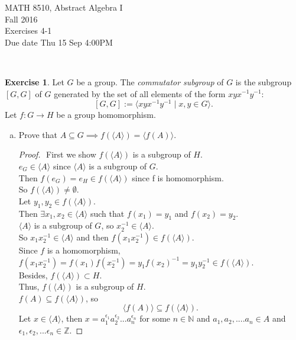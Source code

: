 \documentclass{amsart}
\newcommand{\bbz}{\mathbb{Z}}
\newcommand{\bbn}{\mathbb{N}}
\theoremstyle{plain}
\theoremstyle{definition}
\newtheorem{exer}[lem]{Exercise}
\begin{document}
\noindent MATH 8510, Abstract Algebra I \\
Fall 2016\\
Exercises 4-1\\
Due date Thu 15 Sep 4:00PM

\

%
%


\begin{exer}
Let $G$ be a group. 
The \emph{commutator subgroup} of $G$ is the subgroup $[G,G]$ of $G$ generated by the set of all elements of the form $xyx^{-1}y^{-1}$:
$$[G,G]:=\langle xyx^{-1}y^{-1}\mid x,y\in G\rangle.$$
Let $f\colon G\to H$ be a group homomorphism.
\begin{enumerate}[(a)]
\item Prove that $A\subseteq G\implies f(\langle A\rangle)=\langle f(A)\rangle$.
	\begin{proof}
		$ $\newline
		First we show $f(\langle A\rangle)$ is a subgroup of $H$.\\
		$e_G \in \langle A\rangle$ since $\langle A \rangle$ is a subgroup of $G$.\\
		Then $f(e_G) = e_H \in f(\langle A \rangle)$ since f is homomorphism.\\
		So $f(\langle A\rangle) \neq \emptyset$.\\
		Let $y_1, y_2 \in f(\langle A\rangle)$. \\
		Then $\exists x_1, x_2 \in \langle A\rangle$ such that $f(x_1) = y_1 $ and $f(x_2) = y_2$.\\
		$\langle A\rangle$ is a subgroup of $G$, so $x_2^{-1} \in \langle A\rangle$.\\
		So $x_1x_2^{-1} \in \langle A\rangle$ and then $f(x_1x_2^{-1}) \in f(\langle A\rangle)$.\\
		Since $f$ is a homomorphism, \\
		$f(x_1x_2^{-1}) = f(x_1)f(x_2^{-1}) =y_1f(x_2)^{-1} = y_1y_2^{-1} \in f(\langle A\rangle)$.\\
		Besides, $f(\langle A\rangle) \subset H$.\\ 
		Thus, $f(\langle A\rangle)$ is a subgroup of $H$.\\
		$f(A) \subseteq f(\langle A\rangle)$, so 
		$$\langle f(A) \rangle \subseteq f(\langle A\rangle).$$
		Let $x \in \langle A \rangle$, then $x = a_1^{\epsilon_1}a_2^{\epsilon_2}...a_n^{\epsilon_n}$ for some $n \in \bbn$ and $a_1,a_2,....a_n \in A$ and $\epsilon_1,\epsilon_2,...\epsilon_n \in \bbz$.

\end{proof}
\end{enumerate}
\end{exer}
\end{document}
